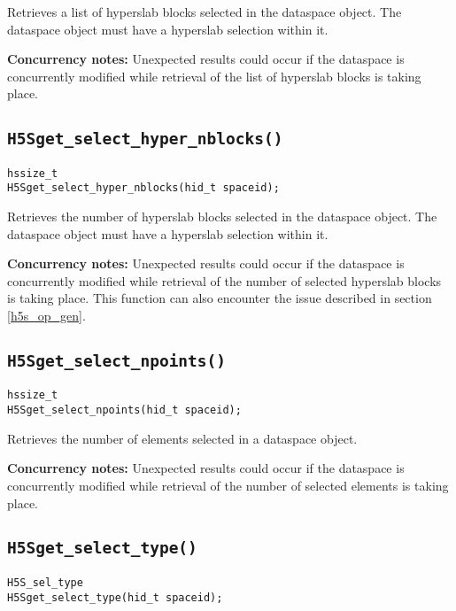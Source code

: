 \documentclass[../HDF5_RFC.tex]{subfiles}
\begin{document}
Retrieves a list of hyperslab blocks selected in the dataspace object. The dataspace object
must have a hyperslab selection within it.

\textbf{Concurrency notes:} Unexpected results could occur if the dataspace is concurrently
modified while retrieval of the list of hyperslab blocks is taking place.

\subsection{\texttt{H5Sget\_select\_hyper\_nblocks()}}
\label{apdx:h5s_func_h5sget_select_hyper_nblocks}

\begin{verbatim}
hssize_t
H5Sget_select_hyper_nblocks(hid_t spaceid);
\end{verbatim}

Retrieves the number of hyperslab blocks selected in the dataspace object. The dataspace
object must have a hyperslab selection within it.

\textbf{Concurrency notes:} Unexpected results could occur if the dataspace is concurrently
modified while retrieval of the number of selected hyperslab blocks is taking place. This
function can also encounter the issue described in section \ref{h5s_op_gen}.

\subsection{\texttt{H5Sget\_select\_npoints()}}
\label{apdx:h5s_func_h5sget_select_npoints}

\begin{verbatim}
hssize_t
H5Sget_select_npoints(hid_t spaceid);
\end{verbatim}

Retrieves the number of elements selected in a dataspace object.

\textbf{Concurrency notes:} Unexpected results could occur if the dataspace is concurrently
modified while retrieval of the number of selected elements is taking place.

\subsection{\texttt{H5Sget\_select\_type()}}
\label{apdx:h5s_func_h5sget_select_type}

\begin{verbatim}
H5S_sel_type
H5Sget_select_type(hid_t spaceid);
\end{verbatim}
\end{document}
